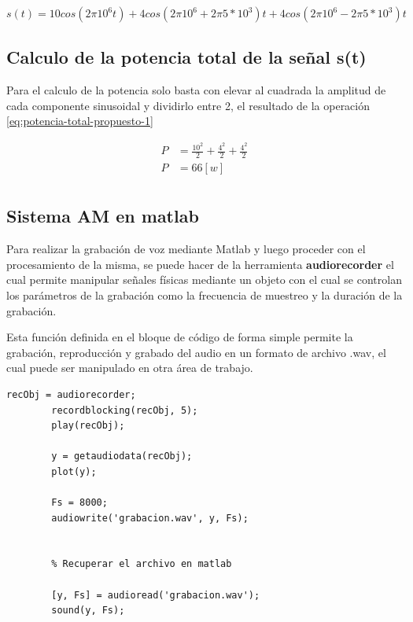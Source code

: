 \documentclass[conference]{IEEEtran}
\begin{document}
	\begin{equation}
		s(t) = 10cos(2\pi10^6t) + 4cos(2\pi10^6 + 2\pi5*10^3)t + 4cos(2\pi10^6 - 2\pi5*10^3)t
	\end{equation}
	
	\subsection{Calculo de la potencia total de la señal s(t)}
	
	Para el calculo de la potencia solo basta con elevar al cuadrada la amplitud de cada componente sinusoidal y dividirlo entre 2, el resultado de la operación \ref{eq:potencia-total-propuesto-1}
	
	\begin{align}
		P &= \frac{10^2}{2} + \frac{4^2}{2} + \frac{4^2}{2}\\
		P &= 66 [w] \\
		\label{eq:potencia-total-propuesto-1}
	\end{align}
	
	\subsection{Sistema AM en matlab}
	Para realizar la grabación de voz mediante Matlab y luego  proceder con el procesamiento de la misma, se puede hacer de la herramienta \textbf{audiorecorder} el cual permite manipular señales físicas mediante un objeto con el cual se controlan los parámetros de la grabación como la frecuencia de muestreo y la duración de la grabación.
	
	Esta función definida en el bloque de código de forma simple permite la grabación, reproducción y grabado del audio en un formato de archivo .wav, el cual puede ser manipulado en otra área de trabajo.
	
	\begin{lstlisting}[caption={Manipulación de audio con audiorecorder}, label={lst:grabacion-audio}]
		recObj = audiorecorder;
		recordblocking(recObj, 5);
		play(recObj);
		
		y = getaudiodata(recObj); 
		plot(y);
		
		Fs = 8000;
		audiowrite('grabacion.wav', y, Fs);
		
		
		% Recuperar el archivo en matlab
		
		[y, Fs] = audioread('grabacion.wav');
		sound(y, Fs);
		
	\end{lstlisting}
	
\end{document}

